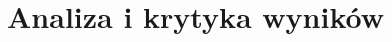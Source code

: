 \documentclass[11pt]{article}
\def\1{\mathds{1}}
\begin{document}
%
\section{Analiza i krytyka wyników}
\end{document}
